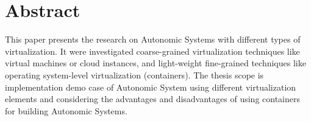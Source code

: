 \newpage
\chapter*{Abstract}

This paper presents the research on Autonomic Systems with different types of virtualization. It were investigated coarse-grained virtualization techniques like virtual machines or cloud instances, and light-weight fine-grained techniques like operating system-level virtualization (containers). The thesis scope is implementation demo case of Autonomic System using different virtualization elements and considering the advantages and disadvantages of using containers for building Autonomic Systems.